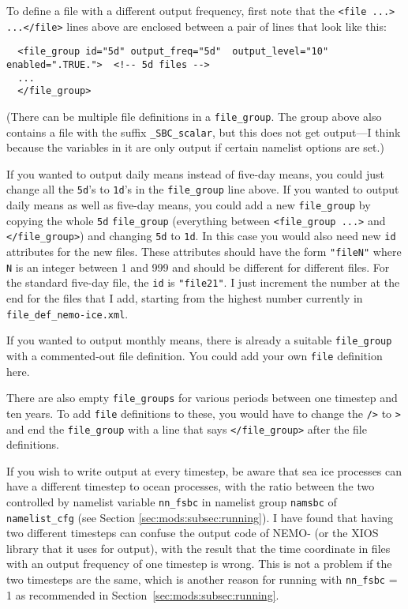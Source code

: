 To define a file with a different output frequency, first note that the \verb|<file ...>| \verb|...</file>| lines above are enclosed between a pair of lines that look like this:

\begingroup\small\begin{verbatim}
  <file_group id="5d" output_freq="5d"  output_level="10" enabled=".TRUE.">  <!-- 5d files -->
  ...
  </file_group>
\end{verbatim}\endgroup

\noindent{}(There can be multiple file definitions in a \verb|file_group|.
The group above also contains a file with the suffix \verb|_SBC_scalar|, but this does not get output---I think because the variables in it are only output if certain namelist options are set.)

If you wanted to output daily means instead of five-day means, you could just change all the \verb|5d|'s to \verb|1d|'s in the \verb|file_group| line above.
If you wanted to output daily means as well as five-day means, you could add a new \verb|file_group| by copying the whole \verb|5d| \verb|file_group| (everything between \verb|<file_group ...>| and \verb|</file_group>|) and changing \verb|5d| to \verb|1d|.
In this case you would also need new \verb|id| attributes for the new files.
These attributes should have the form \verb|"fileN"| where \verb|N| is an integer between 1 and 999 and should be different for different files.
For the standard five-day file, the \verb|id| is \verb|"file21"|.
I just increment the number at the end for the files that I add, starting from the highest number currently in \verb|file_def_nemo-ice.xml|.

If you wanted to output monthly means, there is already a suitable \verb|file_group| with a commented-out file definition.
You could add your own \verb|file| definition here.

There are also empty \verb|file_groups| for various periods between one timestep and ten years.
To add \verb|file| definitions to these, you would have to change the \verb|/>| to \verb|>| and end the \verb|file_group| with a line that says \verb|</file_group>| after the file definitions.

If you wish to write output at every timestep, be aware that sea ice processes can have a different timestep to ocean processes, with the ratio between the two controlled by namelist variable \verb|nn_fsbc| in namelist group \verb|namsbc| of \verb|namelist_cfg| (see Section \ref{sec:mods:subsec:running}).
I have found that having two different timesteps can confuse the output code of NEMO-\SIcu{} (or the XIOS library that it uses for output), with the result that the time coordinate in files with an output frequency of one timestep is wrong.
This is not a problem if the two timesteps are the same, which is another reason for running with \verb|nn_fsbc| = 1 as recommended in Section~\ref{sec:mods:subsec:running}.


